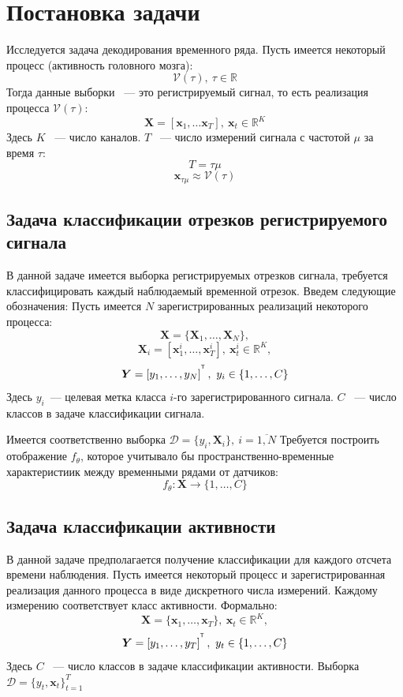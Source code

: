 \documentclass[a4paper, 12pt]{extarticle}
\begin{document}
\section{Постановка задачи}
Исследуется задача декодирования временного ряда. Пусть имеется некоторый процесс (активность головного мозга):
$$\mathcal{V}(\tau),~\tau \in \mathbb{R}$$
Тогда данные выборки ~--- это регистрируемый сигнал, то есть реализация процесса $\mathcal{V}(\tau)$:
$$\bm{X} = \left[\bm{x}_1,\dots \bm{x}_{T}\right],~\bm{x}_t \in \mathbb{R}^K$$
Здесь $K$ ~--- число каналов. $T$ ~--- число измерений сигнала с частотой $\mu$ за время $\tau$:
$$T = \tau \mu$$
$$\bm{x}_{\tau \mu} \approx \mathcal{V}(\tau)$$
\subsection{Задача классификации отрезков регистрируемого сигнала}
В данной задаче имеется выборка регистрируемых отрезков сигнала, 
требуется классифицировать каждый наблюдаемый временной отрезок. 
Введем следующие обозначения:
Пусть имеется $N$ зарегистрированных реализаций некоторого процесса:
$$\bm{X} = \{\bm{X}_1,\dots, \bm{X}_N\},$$
$$\bm{X}_i = \left[\bm{x}^i_1,\dots, \bm{x}^i_{T}\right], ~\bm{x}^i_t \in \mathbb{R}^K,$$
$$\bm{Y} = \left[y_1, \dots, y_{N}\right]^{^{\mathsf{T}}},~y_i \in \{1,\dots, C\}$$
Здесь $y_i$~--- целевая метка класса $i$-го зарегистрированного сигнала. $C$ ~--- число классов в задаче классификации сигнала. 

Имеется соответственно выборка $\mathcal{D} = \{y_i, \bm{X}_i\},~  i = \overline{1,N}$
Требуется построить отображение $f_\theta$, которое учитывало 
бы пространственно-временные характеристиик между временными рядами от датчиков:
$$f_\theta: \bm{X} \rightarrow \{1,\dots, C\}$$ 
\subsection{Задача классификации активности}
В данной задаче предполагается получение классификации для каждого отсчета 
времени наблюдения.
Пусть имеется некоторый процесс и зарегистрированная реализация данного 
процесса в виде дискретного числа измерений. Каждому измерению соответствует
класс активности. Формально:
$$\bm{X} = \{\bm{x}_1,\dots, \bm{x}_{T}\}, ~\bm{x}_t \in \mathbb{R}^K,$$
$$\bm{Y} = \left[y_1, \dots, y_{T}\right]^{^{\mathsf{T}}},~y_t \in \{1,\dots, C\}$$
Здесь $C$ ~--- число классов в задаче классификации активности. 
Выборка $\mathcal{D} = \{y_t, \bm{x}_t\}_{t=1}^T$
\end{document}
